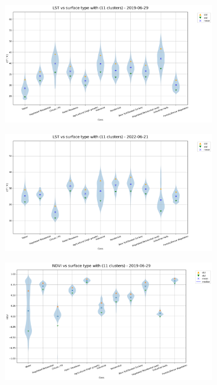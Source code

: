 \documentclass[12pt,a4paper, english,twoside]{scrartcl}
\begin{document}
   \begin{figure}[!p]
     \begin{subfigure}[b]{\textwidth}
         \centering
         \includegraphics[width=\textwidth]{img/LST vs surface type with (11 clusters) - 2019-06-29.png}
         \label{fig:lstclass01}
     \end{subfigure}
     \begin{subfigure}[b]{\textwidth}
         \centering
         \includegraphics[width=\textwidth]{img/LST vs surface type with (11 clusters) - 2022-06-21.png}
         \label{fig:lstclass02}
     \end{subfigure}
     \begin{subfigure}[b]{\textwidth}
         \centering
         \includegraphics[width=\textwidth]{img/NDVI vs surface type with (11 clusters) - 2019-06-29.png}

\end{subfigure}
\end{figure}
\end{document}
